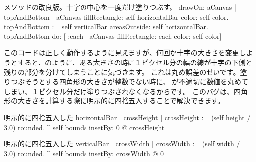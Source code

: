 \documentclass[a4paper,10pt,twoside]{book}
\begin{document}
\begin{method}{メソッドの改良版。十字の中心を一度だけ塗りつぶす。}
drawOn: aCanvas 
	| topAndBottom |
	aCanvas fillRectangle: self horizontalBar color: self color.
	topAndBottom := self verticalBar areasOutside: self horizontalBar. 
	topAndBottom do: [ :each | aCanvas fillRectangle: each color: self color]
\end{method}

このコードは正しく動作するように見えますが、何回か十字の大きさを変更しようとすると、のように、ある大きさの時に１ピクセル分の幅の線が十字の下側と残りの部分を分けてしまうことに気づきます。
これは丸め誤差のせいです。塗りつぶそうとする四角形の大きさが整数でない時に、
が不適切に数値を丸めてしまい、１ピクセル分だけ塗りつぶされなくなるからです。
このバグは、四角形の大きさを計算する際に明示的に四捨五入することで解決できます。

\begin{method}{明示的に四捨五入した}
horizontalBar
	| crossHeight |
	crossHeight := (self height / 3.0) rounded.
	^ self bounds insetBy: 0 @ crossHeight
\end{method}

\begin{method}{明示的に四捨五入した}
verticalBar
	| crossWidth |
	crossWidth := (self width / 3.0) rounded.
	^ self bounds insetBy: crossWidth @ 0
\end{method}






\end{document}
